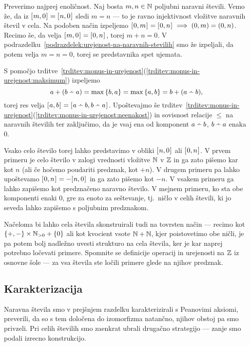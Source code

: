 \begin{dokaz}
Preverimo najprej enoličnost. Naj bosta $m, n \in \mathbb{N}$ poljubni naravni števili. Vemo že, da iz $[\:\!{m, 0}\:\!]_{} = [\:\!{n, 0}\:\!]_{}$ sledi $m = n$ --- to je ravno injektivnost vložitve naravnih števil v cela. Na podoben način izpeljemo $[\:\!{0, m}\:\!]_{} = [\:\!{0, n}\:\!]_{} \implies (0, m) = (0, n)$. Recimo še, da velja $[\:\!{m, 0}\:\!]_{} = [\:\!{0, n}\:\!]_{}$, torej $m + n = 0$. V podrazdelku~\ref{podrazdelek:urejenost-na-naravnih-stevilih} smo že izpeljali, da potem velja $m = n = 0$, torej se predstavnika spet ujemata.

S pomočjo trditve~\ref{trditev:monus-in-urejenost}(\ref{trditev:monus-in-urejenost:maksimum}) izpeljemo
\[a + (b \monus a) = \max\set{b, a} = \max\set{a, b} = b + (a \monus b),\]
torej res velja $\ec{a, b} = \ec{a \monus b, b \monus a}$. Upoštevajmo še trditev~\ref{trditev:monus-in-urejenost}(\ref{trditev:monus-in-urejenost:neenakost}) in sovisnost relacije $\leq$ na naravnih številih ter zaključimo, da je vsaj ena od komponent $a \monus b$, $b \monus a$ enaka $0$.
\end{dokaz}

Vsako celo število torej lahko predstavimo v obliki $[\:\!{n, 0}\:\!]_{}$ ali $[\:\!{0, n}\:\!]_{}$. V prvem primeru je celo število v zalogi vrednosti vložitve $\mathbb{N}$ v $\mathbb{Z}$ in ga zato pišemo kar kot $n$ (ali če hočemo poudariti predznak, kot $+n$). V drugem primeru pa lahko upoštevamo $[\:\!{0, n}\:\!]_{} = -[\:\!{n, 0}\:\!]_{}$ in ga zato pišemo kot $-n$. V vsakem primeru ga lahko zapišemo kot predznačeno naravno število. V mejnem primeru, ko sta obe komponenti enaki $0$, gre za enoto za seštevanje, tj.~ničlo v celih števili, ki jo seveda lahko zapišemo s poljubnim predznakom.

Načeloma bi lahko cela števila skonstruirali tudi na tovrsten način --- recimo kot $\set{+, -} \times \NN_{> 0} + \set{0}$ ali kot kvocient vsote $\mathbb{N} + \mathbb{N}$, kjer poistovetimo obe ničli, je pa potem bolj nadležno uvesti strukturo na cela števila, ker je kar naprej potrebno ločevati primere. Spomnite se definicije operacij in urejenosti na $\mathbb{Z}$ iz osnovne šole --- za vsa števila ste ločili primere glede na njihov predznak.


\subsection{Karakterizacija}

Naravna števila smo v prejšnjem razdelku karakterizirali s Peanovimi aksiomi, preverili, da so s tem določena do izomorfizma natančno, njihov obstoj pa smo privzeli. Pri celih številih smo zaenkrat ubrali drugačno strategijo --- zanje smo podali izrecno konstrukcijo.

